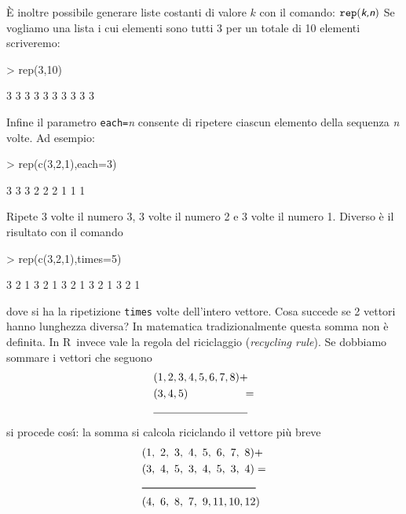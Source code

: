 \documentclass[onecolumn,11pt]{book}
\newcommand{\varia}[1]{\textsl{\textsf{#1}}}
\newcommand{\rpr}{\textsf{R}~}
\begin{document}
\`E inoltre possibile generare liste costanti di valore $k$ con il comando:
$\texttt{rep} (\varia{k,n})$
Se vogliamo una lista i cui elementi sono tutti 3 per un totale di 10 elementi scriveremo:
\begin{Schunk}
\begin{Sinput}
> rep(3,10)
\end{Sinput}
\begin{Soutput}
 [1] 3 3 3 3 3 3 3 3 3 3
\end{Soutput}
\end{Schunk}
Infine il parametro \texttt{each=}\varia{n} consente di ripetere ciascun elemento della sequenza \varia{n} volte. Ad esempio:
\begin{Schunk}
\begin{Sinput}
> rep(c(3,2,1),each=3)
\end{Sinput}
\begin{Soutput}
[1] 3 3 3 2 2 2 1 1 1
\end{Soutput}
\end{Schunk}
Ripete 3 volte il numero 3, 3 volte il numero 2 e 3 volte il numero 1.
Diverso \`e il risultato con il comando
\begin{Schunk}
\begin{Sinput}
> rep(c(3,2,1),times=5)
\end{Sinput}
\begin{Soutput}
 [1] 3 2 1 3 2 1 3 2 1 3 2 1 3 2 1
\end{Soutput}
\end{Schunk}
dove si ha la ripetizione \texttt{times} volte dell'intero vettore.
Cosa succede se 2 vettori hanno lunghezza diversa? In matematica tradizionalmente questa somma non \`e definita. In \rpr invece vale la regola del riciclaggio  (\textit{recycling rule}). Se dobbiamo sommare i vettori che seguono
 \begin{align*} &(1,2,3,4,5,6,7,8)+\\ &(3,4,5)\hskip50pt =\\
 &\noindent\rule{0.25\textwidth}{0.4pt}\\
\end{align*}
si procede cos\'\i: la somma
si calcola riciclando il vettore pi\`u breve
 \begin{align}
&(1,~2,~3,~4,~5,~6,~7,~8)+\\
&(3,~4,~5,~3,~4,~5,~3,~4)=\\
&\noindent\rule{0.3\textwidth}{0.8pt} \\
&(4, ~ 6,~  8 ,~ 7,~  9 ,11, 10,12)\\
\end{align}
\end{document}
